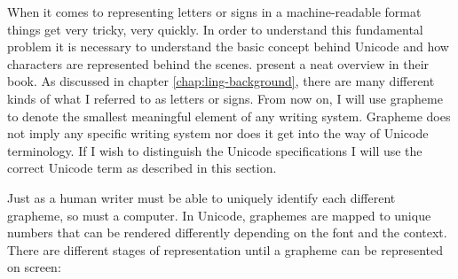 When it comes to representing letters or signs in a machine-readable format things get very tricky, very quickly. In order to understand this fundamental problem it is necessary to understand the basic concept behind Unicode and how characters are represented behind the scenes. \citet{unicode-lingu} present a neat overview in their book. As discussed in chapter \ref{chap:ling-background}, there are many different kinds of what I referred to as letters or signs. From now on, I will use grapheme to denote the smallest meaningful element of any writing system. Grapheme does not imply any specific writing system nor does it get into the way of Unicode terminology. If I wish to distinguish the Unicode specifications I will use the correct Unicode term as described in this section. 

Just as a human writer must be able to uniquely identify each different grapheme, so must a computer. In Unicode, graphemes are mapped to unique numbers that can be rendered differently depending on the font and the context. There are different stages of representation until a grapheme can be represented on screen:

